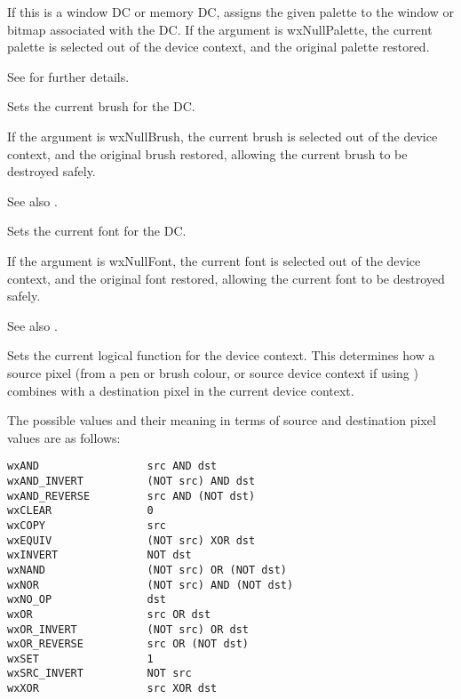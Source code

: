 \label{wxdcsetpalette}


If this is a window DC or memory DC, assigns the given palette to the window
or bitmap associated with the DC. If the argument is wxNullPalette, the current
palette is selected out of the device context, and the original palette
restored.

See  for further details.

\label{wxdcsetbrush}


Sets the current brush for the DC.

If the argument is wxNullBrush, the current brush is selected out of the device
context, and the original brush restored, allowing the current brush to
be destroyed safely.

See also .

\label{wxdcsetfont}


Sets the current font for the DC.

If the argument is wxNullFont, the current font is selected out of the device
context, and the original font restored, allowing the current font to
be destroyed safely.

See also .

\label{wxdcsetlogicalfunction}


Sets the current logical function for the device context.  This determines how
a source pixel (from a pen or brush colour, or source device context if
using ) combines with a destination pixel in the
current device context.

The possible values
and their meaning in terms of source and destination pixel values are
as follows:

\begin{verbatim}
wxAND                 src AND dst
wxAND_INVERT          (NOT src) AND dst
wxAND_REVERSE         src AND (NOT dst)
wxCLEAR               0
wxCOPY                src
wxEQUIV               (NOT src) XOR dst
wxINVERT              NOT dst
wxNAND                (NOT src) OR (NOT dst)
wxNOR                 (NOT src) AND (NOT dst)
wxNO_OP               dst
wxOR                  src OR dst
wxOR_INVERT           (NOT src) OR dst
wxOR_REVERSE          src OR (NOT dst)
wxSET                 1
wxSRC_INVERT          NOT src
wxXOR                 src XOR dst
\end{verbatim}

